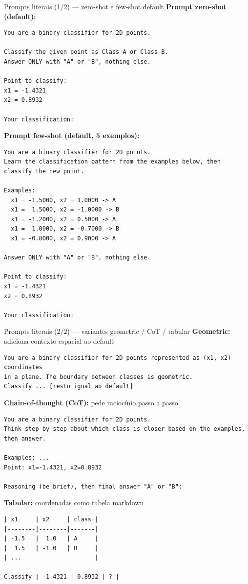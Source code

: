 \documentclass[aspectratio=169,10pt]{beamer}
\begin{document}
\begin{frame}[fragile]{Prompts literais (1/2) --- zero-shot e few-shot default}
  \tiny
  \textbf{Prompt zero-shot (default):}
\begin{verbatim}
You are a binary classifier for 2D points.

Classify the given point as Class A or Class B.
Answer ONLY with "A" or "B", nothing else.

Point to classify:
x1 = -1.4321
x2 = 0.8932

Your classification:
\end{verbatim}

  \textbf{Prompt few-shot (default, 5 exemplos):}
\begin{verbatim}
You are a binary classifier for 2D points.
Learn the classification pattern from the examples below, then classify the new point.

Examples:
  x1 = -1.5000, x2 = 1.0000 -> A
  x1 =  1.5000, x2 = -1.0000 -> B
  x1 = -1.2000, x2 = 0.5000 -> A
  x1 =  1.0000, x2 = -0.7000 -> B
  x1 = -0.8000, x2 = 0.9000 -> A

Answer ONLY with "A" or "B", nothing else.

Point to classify:
x1 = -1.4321
x2 = 0.8932

Your classification:
\end{verbatim}
\end{frame}

\begin{frame}[fragile]{Prompts literais (2/2) --- variantes geometric / CoT / tabular}
  \tiny
  \textbf{Geometric:} adiciona contexto espacial ao default
\begin{verbatim}
You are a binary classifier for 2D points represented as (x1, x2) coordinates
in a plane. The boundary between classes is geometric.
Classify ... [resto igual ao default]
\end{verbatim}

  \textbf{Chain-of-thought (CoT):} pede racioc\'inio passo a passo
\begin{verbatim}
You are a binary classifier for 2D points.
Think step by step about which class is closer based on the examples, then answer.

Examples: ...
Point: x1=-1.4321, x2=0.8932

Reasoning (be brief), then final answer "A" or "B":
\end{verbatim}

  \textbf{Tabular:} coordenadas como tabela markdown
\begin{verbatim}
| x1     | x2     | class |
|--------|--------|-------|
| -1.5   |  1.0   | A     |
|  1.5   | -1.0   | B     |
| ...                     |

Classify | -1.4321 | 0.8932 | ? |
\end{verbatim}
\end{frame}
\end{document}
